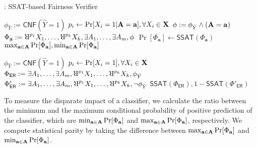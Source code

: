 \begin{algorithm}[t!]
	\caption{\justicia: SSAT-based Fairness Verifier}
	\label{fairness_justicia_algo:enum}
	\footnotesize
	\begin{algorithmic}[1]
		\label{fairness_justicia_algo:justicia_enum_begin}
		\State $ \phi_{\hat{Y}} := \mathsf{CNF}(\hat{Y} = 1) $
		\State $ p_{i} \leftarrow \Pr[X_i = 1|\mathbf{A} = \mathbf{a}], \forall X_i \in \mathbf{X} $
		\State $ \phi := \phi_{\hat{Y}} \wedge (\mathbf{A} =\mathbf{a}) $
		\State $  \Phi_\mathbf{a} := \R^{p_{1}}X_1, \dots, \R^{p_{\numnonsensitive}}X_{\numnonsensitive}, \exists A_1,\dots, \exists A_{\numsensitive},  \phi $
		\State $ \Pr[\Phi_\mathbf{a}]  \leftarrow \mathsf{SSAT}(\Phi_\mathbf{a}) $ 
		\EndFor
		\State \Return $ \max_{\mathbf{a} \in \mathbf{A}} \Pr[\Phi_{\mathbf{a}}], \min_{\mathbf{a} \in \mathbf{A}} \Pr[\Phi_{\mathbf{a}}] $
		\label{fairness_justicia_algo:justicia_enum_end}
		\EndFunction
		
		
		
		\label{fairness_justicia_algo:justicia_learn_begin}
		\State $ \phi_{\hat{Y}} := \mathsf{CNF}(\hat{Y}  = 1) $
		\State $ p_{i} \leftarrow \Pr[X_i=1], \forall X_i \in \mathbf{X} $
		\State $  \Phi_\mathsf{ER} := \exists A_1,\dots, \exists A_{\numsensitive}, \R^{p_{1}}X_1, \dots, \R^{p_{\numnonsensitive}}X_{\numnonsensitive}, \phi_{\hat{Y}} $
		\State $  \Phi'_\mathsf{ER} := \exists A_1,\dots, \exists A_{\numsensitive}, \R^{p_{1}}X_1, \dots, \R^{p_{\numnonsensitive}}X_{\numnonsensitive}, \neg \phi_{\hat{Y}} $
		\State \Return $ \mathsf{SSAT}(\Phi_\mathsf{ER}), 1 - \mathsf{SSAT}(\Phi'_\mathsf{ER}) $
		\label{fairness_justicia_algo:justicia_learn_end}
		\EndFunction
	\end{algorithmic}

\end{algorithm}


To measure the disparate impact of a classifier, we calculate the ratio between the minimum and the maximum conditional probability of positive prediction of the classifier, which are  $ \min_{\mathbf{a} \in \mathbf{A}} \Pr[\Phi_{\mathbf{a}}] $ and $ \max_{\mathbf{a} \in \mathbf{A}} \Pr[\Phi_{\mathbf{a}}] $, respectively. We compute statistical parity by taking the difference between $ \max_{\mathbf{a} \in \mathbf{A}} \Pr[\Phi_{\mathbf{a}}] $ and $ \min_{\mathbf{a} \in \mathbf{A}} \Pr[\Phi_{\mathbf{a}}] $. 



